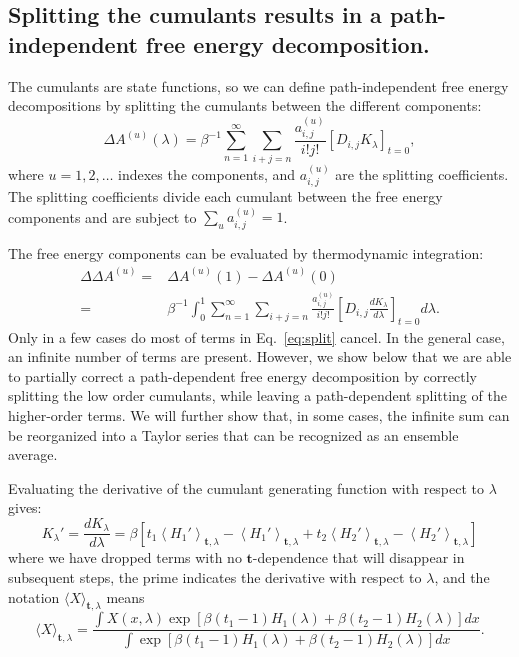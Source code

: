 \documentclass{article}
\let\vec\mathbf
\begin{document}
\subsection{Splitting the cumulants results in a path-independent free energy decomposition.}

The cumulants are state functions, so we can define path-independent free energy decompositions by splitting the cumulants between the different components:
\begin{equation}
\Delta A^{(u)}(\lambda) =
	\beta^{-1} \sum_{n=1}^{\infty}
	\sum_{i+j=n}
	\frac{a_{i,j}^{(u)}}{i!j!}\left[ D_{i,j} K_\lambda\right]_{t=0},
\end{equation}
where $u=1, 2, \ldots$ indexes the components, and $a_{i,j}^{(u)}$ are the splitting coefficients. The splitting coefficients divide each cumulant between the free energy components and are subject to $\sum_u a_{i,j}^{(u)}=1$.

The free energy components can be evaluated by thermodynamic integration:
\begin{align}
\Delta\Delta A^{(u)} =& \Delta A^{(u)}(1) - \Delta A^{(u)}(0) \nonumber \\
					 =&
	\beta^{-1} \int_0^1 \sum_{n=1}^{\infty}
	\sum_{i+j=n}
	\frac{a_{i,j}^{(u)}}{i!j!}
    \left[ D_{i,j} \frac{dK_\lambda}{d\lambda}\right]_{t=0} d\lambda
    \label{eq:split}.
\end{align}
Only in a few cases do most of terms in Eq.~\ref{eq:split} cancel. In the general case, an infinite number of terms are present. However, we show below that we are able to partially correct a path-dependent free energy decomposition by correctly splitting the low order cumulants, while leaving a path-dependent splitting of the higher-order terms. We will further show that, in some cases, the infinite sum can be reorganized into a Taylor series that can be recognized as an ensemble average.

Evaluating the derivative of the cumulant generating function with respect to $\lambda$ gives:
\begin{equation}
K_\lambda' = 
\frac{dK_\lambda}{d\lambda} =
	\beta \left[
		t_1 \left\langle H_1' \right\rangle_{\vec t,\lambda} -
    	\left\langle H_1' \right\rangle_{\vec t,\lambda} +
	    t_2 \left\langle H_2' \right\rangle_{\vec t,\lambda} -
    	\left\langle H_2' \right\rangle_{\vec t,\lambda}
    \right]
\end{equation}
where we have dropped terms with no $\vec t$-dependence that will disappear in subsequent steps, the prime indicates the derivative with respect to $\lambda$, and the notation $\langle X \rangle_{\vec t, \lambda}$ means
\begin{equation}
\langle X \rangle_{\vec t, \lambda}  =
	\frac
    	{\int X(x, \lambda) 
        	\exp\left[
        		\beta(t_1-1)H_1(\lambda) +
            \beta(t_2-1)H_2(\lambda)
        \right] dx
        }
    	{\int
        	\exp\left[
            \beta(t_1-1)H_1(\lambda) +
            \beta(t_2-1)H_2(\lambda)
        \right] dx
        }.
\end{equation}
\end{document}
